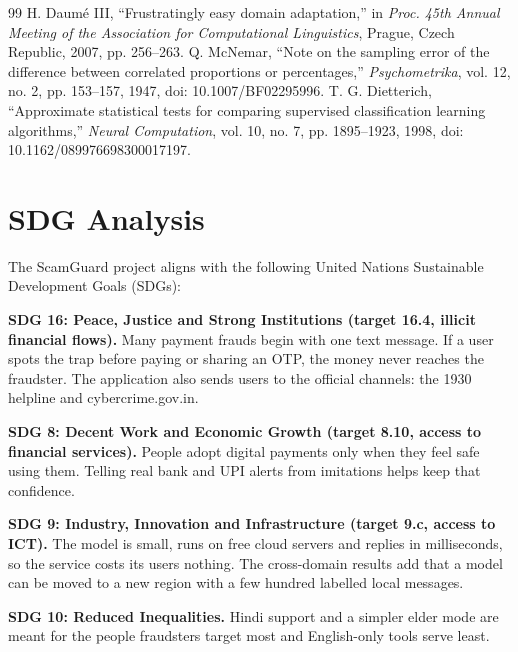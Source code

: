 \begin{thebibliography}{99}
 H. Daum\'e III, ``Frustratingly easy domain adaptation,'' in \textit{Proc. 45th Annual Meeting of the Association for Computational Linguistics}, Prague, Czech Republic, 2007, pp. 256--263.
 Q. McNemar, ``Note on the sampling error of the difference between correlated proportions or percentages,'' \textit{Psychometrika}, vol. 12, no. 2, pp. 153--157, 1947, doi: 10.1007/BF02295996.
 T. G. Dietterich, ``Approximate statistical tests for comparing supervised classification learning algorithms,'' \textit{Neural Computation}, vol. 10, no. 7, pp. 1895--1923, 1998, doi: 10.1162/089976698300017197.
\end{thebibliography}
\clearpage
\chapter*{SDG Analysis}
The ScamGuard project aligns with the following United Nations Sustainable Development Goals (SDGs):

\textbf{SDG 16: Peace, Justice and Strong Institutions (target 16.4, illicit financial flows).} Many payment frauds begin with one text message. If a user spots the trap before paying or sharing an OTP, the money never reaches the fraudster. The application also sends users to the official channels: the 1930 helpline and cybercrime.gov.in.

\textbf{SDG 8: Decent Work and Economic Growth (target 8.10, access to financial services).} People adopt digital payments only when they feel safe using them. Telling real bank and UPI alerts from imitations helps keep that confidence.

\textbf{SDG 9: Industry, Innovation and Infrastructure (target 9.c, access to ICT).} The model is small, runs on free cloud servers and replies in milliseconds, so the service costs its users nothing. The cross-domain results add that a model can be moved to a new region with a few hundred labelled local messages.

\textbf{SDG 10: Reduced Inequalities.} Hindi support and a simpler elder mode are meant for the people fraudsters target most and English-only tools serve least.

